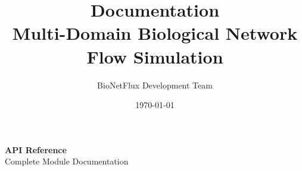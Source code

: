 \documentclass[11pt,a4paper]{article}
\title{\Huge {\textbf{\bionetflux{} Documentation}} \\[0.5cm]
       \Large Multi-Domain Biological Network Flow Simulation}
\author{BioNetFlux Development Team}
\date{\today}
\begin{document}




\tableofcontents
\clearpage

%
%
%
%
%
%
%
%
%

\clearpage
\setcounter{page}{1}
\renewcommand{\thepage}{A.\arabic{page}}


\clearpage
\thispagestyle{empty}
\vspace*{\fill}
\begin{center}
	{\Huge \textbf{API Reference}}\\[1cm]
	{\Large Complete Module Documentation}\\[2cm]
\end{center}
\vspace*{\fill}
\clearpage

\setcounter{page}{1}
\renewcommand{\thepage}{A.\arabic{page}}
 
 \newpage
 \setcounter{page}{1}
\renewcommand{\thepage}{B.\arabic{page}}

\newpage
 \setcounter{page}{1}
\renewcommand{\thepage}{C.\arabic{page}}

\newpage
 \setcounter{page}{1}
\renewcommand{\thepage}{D.\arabic{page}}

\newpage
 \setcounter{page}{1}
\renewcommand{\thepage}{E.\arabic{page}}

\newpage
 \setcounter{page}{1}
\renewcommand{\thepage}{F.\arabic{page}}

\newpage
 \setcounter{page}{1}
\renewcommand{\thepage}{G.\arabic{page}}

\newpage
 \setcounter{page}{1}
\renewcommand{\thepage}{H.\arabic{page}}

\newpage
 \setcounter{page}{1}
\renewcommand{\thepage}{I.\arabic{page}}

\newpage
 \setcounter{page}{1}
\renewcommand{\thepage}{J.\arabic{page}}

\newpage
 \setcounter{page}{1}
\renewcommand{\thepage}{K.\arabic{page}}

\newpage
 \setcounter{page}{1}
\renewcommand{\thepage}{L.\arabic{page}}

\newpage
 \setcounter{page}{1}
\renewcommand{\thepage}{M.\arabic{page}}

\newpage
 \setcounter{page}{1}
\renewcommand{\thepage}{N.\arabic{page}}

\newpage
 \setcounter{page}{1}
\renewcommand{\thepage}{O.\arabic{page}}

\newpage
 \setcounter{page}{1}
\renewcommand{\thepage}{P.\arabic{page}}


%
%
%
%
\end{document}
